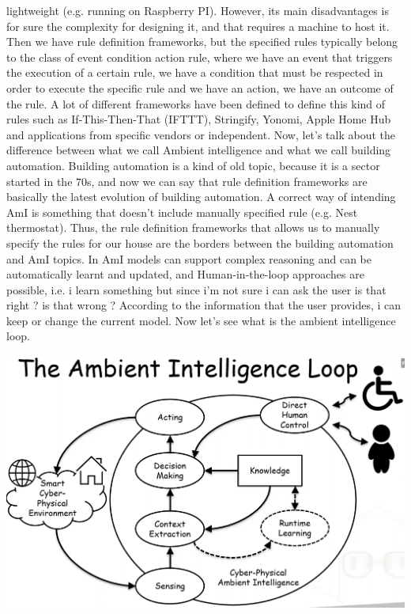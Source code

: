 \documentclass[11pt]{article}
\begin{document}
lightweight (e.g. running on Raspberry PI). However, its main disadvantages is for sure the complexity for designing it, and that requires a machine to host it. Then we have rule definition frameworks, but the specified rules typically belong to the class of event condition action rule, where we have an event that triggers the execution of a certain rule, we have a condition that must be respected in order to execute the specific rule and we have an action, we have an outcome of the rule. A lot of different frameworks have been defined to define this kind of rules such as If-This-Then-That (IFTTT), Stringify, Yonomi, Apple Home Hub and applications from specific vendors or independent. Now, let's talk about the difference between what we call Ambient intelligence and what we call building automation. Building automation is a kind of old topic, because it is a sector started in the $70$s, and now we can say that rule definition frameworks are basically the latest evolution of building automation. A correct way of intending AmI is something that doesn't include manually specified rule (e.g. Nest thermostat). Thus, the rule definition frameworks that allows us to manually specify the rules for our house are the borders between the building automation and AmI topics. In AmI models can support complex reasoning and can be automatically learnt and updated, and Human-in-the-loop approaches are possible, i.e. i learn something but since i'm not sure i can ask the user is that right ? is that wrong ? According to the information that the user provides, i can keep or change the current model. Now let's see what is the ambient intelligence loop.

\begin{center}
\includegraphics[scale=0.15]{./images/Ambient_intelligence_loop.png}
\end{center}
\end{document}
